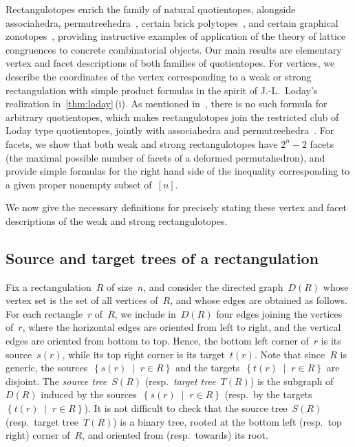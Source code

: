 \documentclass{amsart}
\theoremstyle{definition}
\newcommand{\set}[2]{\left\{ #1 \;\middle|\; #2 \right\}} %
\newcommand{\darkblue}{\color{darkblue}} %
\newcommand{\defn}[1]{\textsl{\darkblue #1}} %
\begin{document}
Rectangulotopes enrich the family of natural quotientopes, alongside associahedra, permutreehedra~\cite{MR3856522}, certain brick polytopes~\cite{PilaudSantos-brickPolytopes, PilaudStump-brickPolytopes, Pilaud-brickAlgebra}, and certain graphical zonotopes~\cite{Pilaud-brickAlgebra, Pilaud-acyclicReorientationLattices}, providing instructive examples of application of the theory of lattice congruences to concrete combinatorial objects.
Our main results are elementary vertex and facet descriptions of both families of quotientopes.
For vertices, we describe the coordinates of the vertex corresponding to a weak or strong rectangulation with simple product formulas in the spirit of J.-L.~Loday's realization in~\cref{thm:loday}\,(i).
As mentioned in~\cite{PilaudSantosZiegler}, there is no such formula for arbitrary quotientopes, which makes rectangulotopes join the restricted club of Loday type quotientopes, jointly with associahedra and permutreehedra~\cite{MR3856522}.
For facets, we show that both weak and strong rectangulotopes have $2^n-2$ facets (the maximal possible number of facets of a deformed permutahedron), and provide simple formulas for the right hand side of the inequality corresponding to a given proper nonempty subset of~$[n]$.

We now give the necessary definitions for precisely stating these vertex and facet descriptions of the weak and strong rectangulotopes.


\subsection{Source and target trees of a rectangulation}
\label{subsec:sourceTargetTrees}

Fix a rectangulation~$R$ of size~$n$, and consider the directed graph~$D(R)$ whose vertex set is the set of all vertices of~$R$, and whose edges are obtained as follows.
For each rectangle~$r$ of~$R$, we include in~$D(R)$ four edges joining the vertices of~$r$, where the horizontal edges are oriented from left to right, and the vertical edges are oriented from bottom to top.
Hence, the bottom left corner of~$r$ is its source~$s(r)$, while its top right corner is its target~$t(r)$.
Note that since~$R$ is generic, the sources~$\set{s(r)}{r \in R}$ and the targets~$\set{t(r)}{r \in R}$ are disjoint.
The \defn{source tree}~$S(R)$ (resp.~\defn{target tree}~$T(R)$) is the subgraph of~$D(R)$ induced by the sources~$\set{s(r)}{r \in R}$ (resp.~by the targets~$\set{t(r)}{r \in R}$).
It is not difficult to check that the source tree~$S(R)$ (resp.~target tree~$T(R)$) is a binary tree, rooted at the bottom left (resp.~top right) corner of~$R$, and oriented from (resp.~towards) its root.
\end{document}
